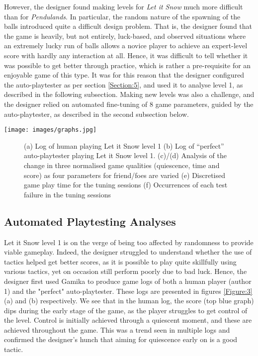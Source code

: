 \documentclass{IEEEtran}
\begin{document}
However, the designer found making levels for \emph{Let it Snow} much more difficult than for \emph{Pendulands}. In particular, the random nature of the spawning of the balls introduced quite a difficult design problem. That is, the designer found that the game is heavily, but not entirely, luck-based, and observed situations where an extremely lucky run of balls allows a novice player to achieve an expert-level score with hardly any interaction at all. Hence, it was difficult to tell whether it was possible to get better through practice, which is rather a pre-requisite for an enjoyable game of this type. It was for this reason that the designer configured the auto-playtester as per section \ref{Section:5}, and used it to analyse level 1, as described in the following subsection. Making new levels was also a challenge, and the designer relied on automated fine-tuning of 8 game parameters, guided by the auto-playtester, as described in the second subsection below.

\begin{strip}
    \centering
    \texttt{[image: images/graphs.jpg]}
    \label{Figure:3}

\end{strip}

\begin{figure}
    \centering
    \caption{(a) Log of human playing Let it Snow level 1 (b) Log of “perfect” auto-playtester playing Let it Snow level 1. (c)/(d) Analysis of the change in three
normalised game qualities (quiescence, time and score) as four parameters for friend/foes are varied (e) Discretised game play time for the tuning sessions
(f) Occurrences of each test failure in the tuning sessions}
\end{figure}


\subsection{ Automated Playtesting Analyses}

Let it Snow level 1 is on the verge of being too affected by randomness to provide viable gameplay. Indeed, the designer struggled to understand whether the use of tactics helped get better scores, as it is possible to play quite skillfully using various tactics, yet on occasion still perform poorly due to bad luck. Hence, the designer first used Gamika to produce game logs of both a human player (author 1) and the "perfect" auto-playtester. These logs are presented in figures \ref{Figure:3}(a) and (b) respectively.
We see that in the human log, the score (top blue graph) dips during the early stage of the game, as the player struggles to get control of the level. Control is initially achieved through a quiescent moment, and these are achieved throughout the game. This was a trend seen in multiple logs and confirmed the designer's hunch that aiming for quiescence early on is a good tactic.
\end{document}
